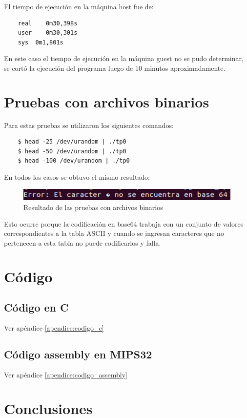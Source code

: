 \documentclass[titlepage,a4paper]{article}
\begin{document}
El tiempo de ejecución en la máquina host fue de:

\begin{verbatim}
    real	0m30,398s
    user	0m30,301s
    sys	 0m1,801s
\end{verbatim}

En este caso el tiempo de ejecución en la máquina guest no se pudo determinar, se cortó la ejecución del programa luego de 10 minutos aproximadamente.

\section{Pruebas con archivos binarios}

Para estas pruebas se utilizaron los siguientes comandos:

\begin{verbatim}
    $ head -25 /dev/urandom | ./tp0
    $ head -50 /dev/urandom | ./tp0
    $ head -100 /dev/urandom | ./tp0
\end{verbatim}

En todos los casos se obtuvo el mismo resultado:

\begin{figure}[H]
\centering
\includegraphics[scale=0.6]{images/errorArchivoBinario.png}
\caption{Resultado de las pruebas con archivos binarios}
\label{fig:errorBinario}
\end{figure}

Esto ocurre porque la codificación en base64 trabaja con un conjunto de valores correspondientes a la tabla ASCII y cuando se ingresan caracteres que no pertenecen a esta tabla no puede codificarlos y falla.


\section{Código}
\subsection{Código en C}
Ver apéndice \ref{apendice:codigo_c}

\subsection{Código assembly en MIPS32}
Ver apéndice \ref{apendice:codigo_assembly}

\section{Conclusiones}
\end{document}
